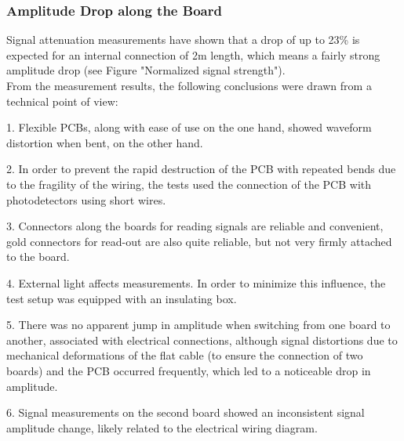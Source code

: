 \documentclass[../BTOF_summary.tex]{subfiles}
\begin{document}
\subsubsection{Amplitude Drop along the Board}
Signal attenuation measurements have shown that a drop of up to 23\% is expected for an internal connection of 2m length, which means a fairly strong amplitude drop (see Figure "Normalized signal strength").
\\
From the measurement results, the following conclusions were drawn from a technical point of view:

1. Flexible PCBs, along with ease of use on the one hand, showed waveform distortion when bent, on the other hand.

2. In order to prevent the rapid destruction of the PCB with repeated bends due to the fragility of the wiring, the tests used the connection of the PCB with photodetectors using short wires.

3. Connectors along the boards for reading signals are reliable and convenient, gold connectors for read-out are also quite reliable, but not very firmly attached to the board.

4. External light affects measurements. In order to minimize this influence, the test setup was equipped with an insulating box.

5. There was no apparent jump in amplitude when switching from one board to another, associated with electrical connections, although signal distortions due to mechanical deformations of the flat cable (to ensure the connection of two boards) and the PCB occurred frequently, which led to a noticeable drop in amplitude.

6. Signal measurements on the second board showed an inconsistent signal amplitude change, likely related to the electrical wiring diagram.
\\
\end{document}
